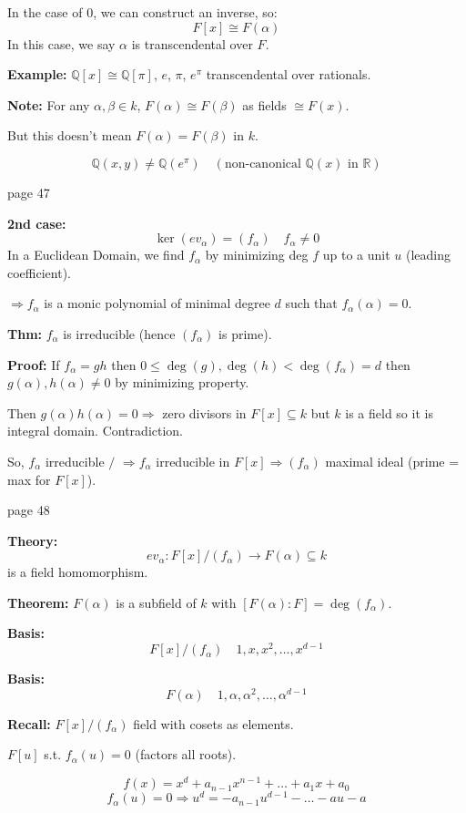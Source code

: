 \documentclass{article}
\begin{document}
In the case of 0, we can construct an inverse, so:
\[
F[x] \cong F(\alpha)
\]
In this case, we say $\alpha$ is transcendental over $F$.

\textbf{Example:} $\mathbb{Q}[x] \cong \mathbb{Q}[\pi]$, $e$, $\pi$, $e^\pi$ transcendental over rationals.

\textbf{Note:} For any $\alpha, \beta \in k$, $F(\alpha) \cong F(\beta)$ as fields $\cong F(x)$.

But this doesn't mean $F(\alpha) = F(\beta)$ in $k$.

\[
\mathbb{Q}(x, y) \neq \mathbb{Q}(e^\pi) \quad (\text{non-canonical } \mathbb{Q}(x) \text{ in } \mathbb{R})
\]

\newpage
\noindent page 47

\textbf{2nd case:}
\[
\ker(ev_\alpha) = (f_\alpha) \quad f_\alpha \neq 0
\]
In a Euclidean Domain, we find $f_\alpha$ by minimizing deg $f$ up to a unit $u$ (leading coefficient).

$\Rightarrow f_\alpha$ is a monic polynomial of minimal degree $d$ such that $f_\alpha(\alpha) = 0$.

\textbf{Thm:} $f_\alpha$ is irreducible (hence $(f_\alpha)$ is prime).

\textbf{Proof:} If $f_\alpha = gh$ then $0 \leq \deg(g), \deg(h) < \deg(f_\alpha) = d$ then $g(\alpha), h(\alpha) \neq 0$ by minimizing property.

Then $g(\alpha)h(\alpha) = 0 \Rightarrow$ zero divisors in $F[x] \subseteq k$ but $k$ is a field so it is integral domain. Contradiction.

So, $f_\alpha$ irreducible $/$ $\Rightarrow f_\alpha$ irreducible in $F[x] \Rightarrow (f_\alpha)$ maximal ideal (prime = max for $F[x]$).

\newpage
\noindent page 48

\textbf{Theory:}
\[
ev_\alpha : F[x]/(f_\alpha) \to F(\alpha) \subseteq k
\]
is a field homomorphism.

\textbf{Theorem:} $F(\alpha)$ is a subfield of $k$ with $[F(\alpha) : F] = \deg(f_\alpha)$.

\textbf{Basis:}
\[
F[x]/(f_\alpha) \quad 1, x, x^2, \ldots, x^{d-1}
\]

\textbf{Basis:}
\[
F(\alpha) \quad 1, \alpha, \alpha^2, \ldots, \alpha^{d-1}
\]

\textbf{Recall:} $F[x]/(f_\alpha)$ field with cosets as elements.

$F[u]$ s.t. $f_\alpha(u) = 0$ (factors all roots).

\[
f(x) = x^d + a_{n-1} x^{n-1} + \ldots + a_1 x + a_0
\]
\[
f_\alpha(u) = 0 \Rightarrow u^d = -a_{n-1}u^{d-1} - \ldots - au - a
\]
\end{document}
